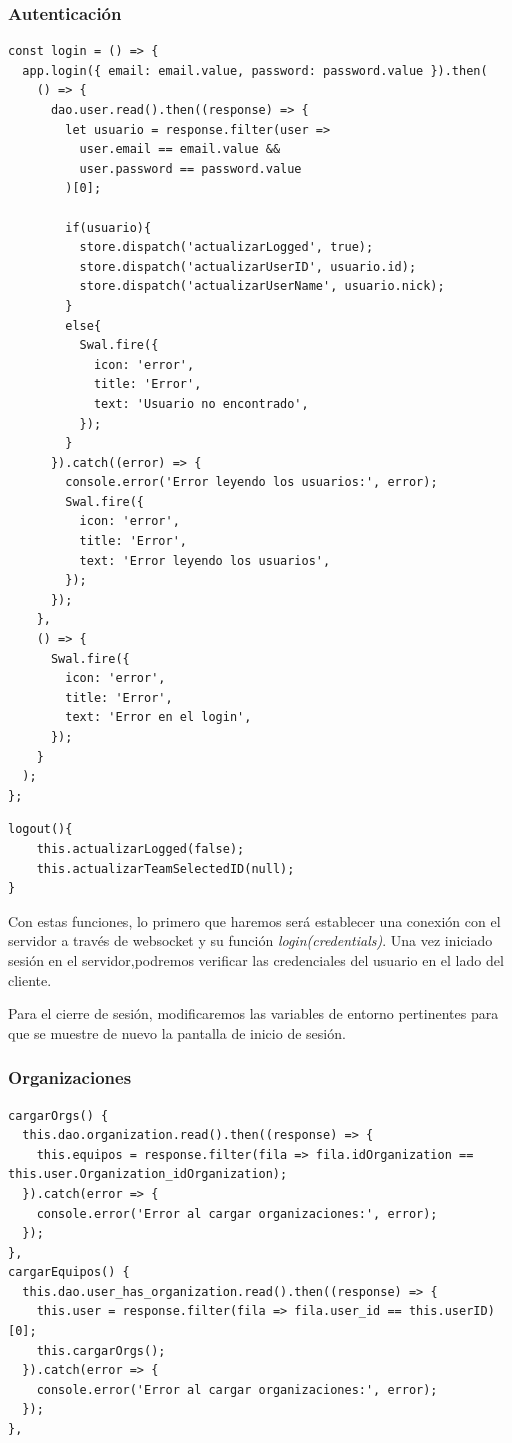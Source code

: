 \subsubsection{Autenticación}
\begin{lstlisting}[style=Javascript-color, caption={Lógica de inicio de sesión en el cliente}, label=Javascript-color_code_auth]
const login = () => {
  app.login({ email: email.value, password: password.value }).then(
    () => {
      dao.user.read().then((response) => {
        let usuario = response.filter(user =>
          user.email == email.value &&
          user.password == password.value
        )[0];

        if(usuario){
          store.dispatch('actualizarLogged', true);
          store.dispatch('actualizarUserID', usuario.id);
          store.dispatch('actualizarUserName', usuario.nick);
        }
        else{
          Swal.fire({
            icon: 'error',
            title: 'Error',
            text: 'Usuario no encontrado',
          });
        }
      }).catch((error) => {
        console.error('Error leyendo los usuarios:', error);
        Swal.fire({
          icon: 'error',
          title: 'Error',
          text: 'Error leyendo los usuarios',
        });
      });
    },
    () => {
      Swal.fire({
        icon: 'error',
        title: 'Error',
        text: 'Error en el login',
      });
    }
  );
};
\end{lstlisting}

\begin{lstlisting}[style=Javascript-color, caption={Lógica de cierre de sesión en el cliente}, label=Javascript-color_code_auth_logout]
logout(){
	this.actualizarLogged(false);
	this.actualizarTeamSelectedID(null);
}
\end{lstlisting}

Con estas funciones, lo primero que haremos será establecer una conexión con el servidor a través de websocket y su función \textit{login(credentials)}. Una vez iniciado sesión en el servidor,podremos verificar las credenciales del usuario en el lado del cliente.

Para el cierre de sesión, modificaremos las variables de entorno pertinentes para que se muestre de nuevo la pantalla de inicio de sesión.

\subsubsection{Organizaciones}
\begin{lstlisting}[style=Javascript-color, caption={Lógica de la obtención de organizaciones},label=Javascript-color_code_selec_team]
cargarOrgs() {
  this.dao.organization.read().then((response) => {
    this.equipos = response.filter(fila => fila.idOrganization == this.user.Organization_idOrganization);
  }).catch(error => {
    console.error('Error al cargar organizaciones:', error);
  });
},
cargarEquipos() {
  this.dao.user_has_organization.read().then((response) => {
    this.user = response.filter(fila => fila.user_id == this.userID)[0];
    this.cargarOrgs();
  }).catch(error => {
    console.error('Error al cargar organizaciones:', error);
  });
},
\end{lstlisting}

